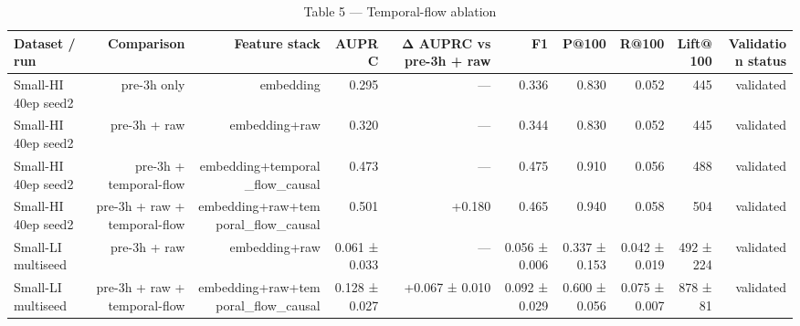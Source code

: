 \begin{table}[t]
\centering
\caption{Table 5 — Temporal-flow ablation}
\begin{tabular}{lrrrrrrrrr}
\toprule
Dataset / run & Comparison & Feature stack & AUPRC & Δ AUPRC vs pre-3h + raw & F1 & P@100 & R@100 & Lift@100 & Validation status \\
\midrule
Small-HI 40ep seed2 & pre-3h only & embedding & 0.295 & --- & 0.336 & 0.830 & 0.052 & 445 & validated \\
Small-HI 40ep seed2 & pre-3h + raw & embedding+raw & 0.320 & --- & 0.344 & 0.830 & 0.052 & 445 & validated \\
Small-HI 40ep seed2 & pre-3h + temporal-flow & embedding+temporal\_flow\_causal & 0.473 & --- & 0.475 & 0.910 & 0.056 & 488 & validated \\
Small-HI 40ep seed2 & pre-3h + raw + temporal-flow & embedding+raw+temporal\_flow\_causal & 0.501 & +0.180 & 0.465 & 0.940 & 0.058 & 504 & validated \\
Small-LI multiseed & pre-3h + raw & embedding+raw & 0.061 ± 0.033 & --- & 0.056 ± 0.006 & 0.337 ± 0.153 & 0.042 ± 0.019 & 492 ± 224 & validated \\
Small-LI multiseed & pre-3h + raw + temporal-flow & embedding+raw+temporal\_flow\_causal & 0.128 ± 0.027 & +0.067 ± 0.010 & 0.092 ± 0.029 & 0.600 ± 0.056 & 0.075 ± 0.007 & 878 ± 81 & validated \\
\bottomrule
\end{tabular}
\end{table}
